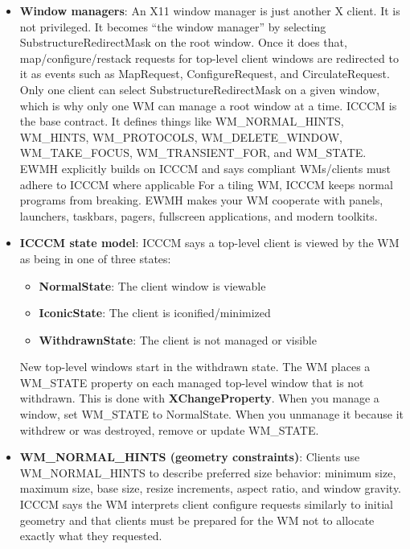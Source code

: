 \documentclass{report}
\begin{document}
    \pagebreak 
    \begin{itemize}
        \item \textbf{Window managers}: An X11 window manager is just another X client. It is not privileged. It becomes “the window manager” by selecting SubstructureRedirectMask on the root window. Once it does that, map/configure/restack requests for top-level client windows are redirected to it as events such as MapRequest, ConfigureRequest, and CirculateRequest. Only one client can select SubstructureRedirectMask on a given window, which is why only one WM can manage a root window at a time.
            \bigbreak \noindent 
            ICCCM is the base contract. It defines things like WM\_NORMAL\_HINTS, WM\_HINTS, WM\_PROTOCOLS, WM\_DELETE\_WINDOW, WM\_TAKE\_FOCUS, WM\_TRANSIENT\_FOR, and WM\_STATE. EWMH explicitly builds on ICCCM and says compliant WMs/clients must adhere to ICCCM where applicable
            \bigbreak \noindent 
            For a tiling WM, ICCCM keeps normal programs from breaking. EWMH makes your WM cooperate with panels, launchers, taskbars, pagers, fullscreen applications, and modern toolkits.
        \item \textbf{ICCCM state model}: ICCCM says a top-level client is viewed by the WM as being in one of three states:
            \begin{itemize}
                \item \textbf{NormalState}:	The client window is viewable
                \item \textbf{IconicState}:	The client is iconified/minimized
                \item \textbf{WithdrawnState}:	The client is not managed or visible
            \end{itemize}
            New top-level windows start in the withdrawn state. The WM places a WM\_STATE property on each managed top-level window that is not withdrawn. This is done with \textbf{XChangeProperty}.
            \bigbreak \noindent 
            When you manage a window, set WM\_STATE to NormalState. When you unmanage it because it withdrew or was destroyed, remove or update WM\_STATE.
        \item \textbf{WM\_NORMAL\_HINTS (geometry constraints)}: Clients use WM\_NORMAL\_HINTS to describe preferred size behavior: minimum size, maximum size, base size, resize increments, aspect ratio, and window gravity. ICCCM says the WM interprets client configure requests similarly to initial geometry and that clients must be prepared for the WM not to allocate exactly what they requested.

\end{itemize}
\end{document}
